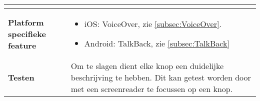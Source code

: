 \begin{table}[H]
\begin{tabular}{|l|p{12cm}|}
\begin{itemize}
        \end{itemize}                                                                                                                                                                                                                                                                                                                                                                                                                    \\ 
      \hline
      \textbf{Platform specifieke feature} & \begin{itemize}
          \item iOS: VoiceOver, zie \ref{subsec:VoiceOver}.
          \item Android: TalkBack, zie \ref{subsec:TalkBack}
      \end{itemize}                                                                                                                                                                       \\ 
        \hline
        \textbf{Testen}                       & Om te slagen dient elke knop een duidelijke beschrijving te hebben. Dit kan getest worden door met een screenreader te focussen op een knop.                                                                                                                                                                                              \\
        \hline
    \end{tabular}
    
\end{table}

